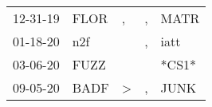 \begin{supertabular}{p{0.07\textwidth}p{0.06\textwidth}p{0.02\textwidth}p{0.02\textwidth}p{0.06\textwidth}}
 12-31-19\textsuperscript{} &           FLOR\textsuperscript{} &                , &             , &           MATR\textsuperscript{} \\
 01-18-20\textsuperscript{} &            n2f\textsuperscript{} &                  &             , &           iatt\textsuperscript{} \\
 03-06-20\textsuperscript{} &           FUZZ\textsuperscript{} &                  &               &                            *CS1* \\
 09-05-20\textsuperscript{} &           BADF\textsuperscript{} &     \textgreater &             , &           JUNK\textsuperscript{} \\
\end{supertabular}
